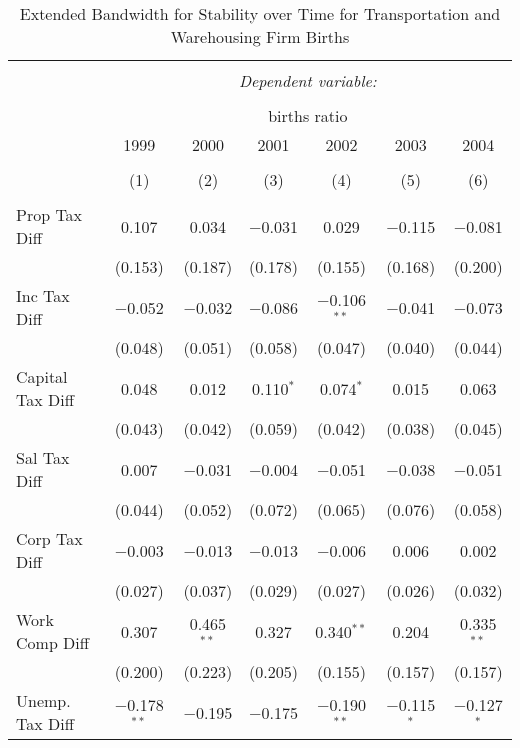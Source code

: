 
\begin{table}[!htbp] \centering 
  \caption{Extended Bandwidth for Stability over Time for  Transportation and Warehousing Firm Births} 
  \label{48-49 ebyear} 
\small 
\begin{tabular}{@{\extracolsep{5pt}}lcccccc} 
\\[-1.8ex]\hline 
\hline \\[-1.8ex] 
 & \multicolumn{6}{c}{\textit{Dependent variable:}} \\ 
\cline{2-7} 
\\[-1.8ex] & \multicolumn{6}{c}{births ratio} \\ 
 & 1999 & 2000 & 2001 & 2002 & 2003 & 2004 \\ 
\\[-1.8ex] & (1) & (2) & (3) & (4) & (5) & (6)\\ 
\hline \\[-1.8ex] 
 Prop Tax Diff & 0.107 & 0.034 & $-$0.031 & 0.029 & $-$0.115 & $-$0.081 \\ 
  & (0.153) & (0.187) & (0.178) & (0.155) & (0.168) & (0.200) \\ 
  Inc Tax Diff & $-$0.052 & $-$0.032 & $-$0.086 & $-$0.106$^{**}$ & $-$0.041 & $-$0.073 \\ 
  & (0.048) & (0.051) & (0.058) & (0.047) & (0.040) & (0.044) \\ 
  Capital Tax Diff & 0.048 & 0.012 & 0.110$^{*}$ & 0.074$^{*}$ & 0.015 & 0.063 \\ 
  & (0.043) & (0.042) & (0.059) & (0.042) & (0.038) & (0.045) \\ 
  Sal Tax Diff & 0.007 & $-$0.031 & $-$0.004 & $-$0.051 & $-$0.038 & $-$0.051 \\ 
  & (0.044) & (0.052) & (0.072) & (0.065) & (0.076) & (0.058) \\ 
  Corp Tax Diff & $-$0.003 & $-$0.013 & $-$0.013 & $-$0.006 & 0.006 & 0.002 \\ 
  & (0.027) & (0.037) & (0.029) & (0.027) & (0.026) & (0.032) \\ 
  Work Comp Diff & 0.307 & 0.465$^{**}$ & 0.327 & 0.340$^{**}$ & 0.204 & 0.335$^{**}$ \\ 
  & (0.200) & (0.223) & (0.205) & (0.155) & (0.157) & (0.157) \\ 
  Unemp. Tax Diff & $-$0.178$^{**}$ & $-$0.195 & $-$0.175 & $-$0.190$^{**}$ & $-$0.115$^{*}$ & $-$0.127$^{*}$ \\ 

\end{tabular}
\end{table}
